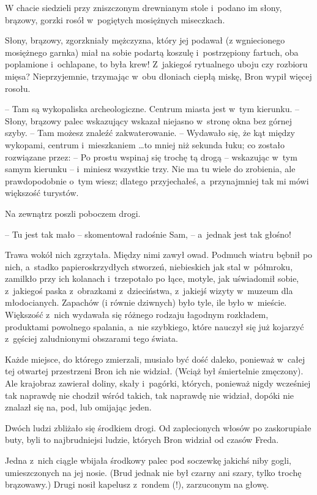 \documentclass[oneside,polish,11pt,rmheadings]{mwbk}
\begin{document}
W chacie siedzieli przy zniszczonym drewnianym stole i~podano im słony, brązowy, gorzki rosół w~pogiętych mosiężnych miseczkach. 

Słony, brązowy, zgorzkniały mężczyzna, który jej podawał (z wgniecionego mosiężnego garnka) miał na sobie podartą koszulę i~postrzępiony fartuch, oba poplamione i~ochlapane, to była krew! Z~jakiegoś rytualnego uboju czy rozbioru mięsa? Nieprzyjemnie, trzymając w~obu dłoniach ciepłą miskę, Bron wypił więcej rosołu. 

-- Tam są wykopaliska archeologiczne. Centrum miasta jest w~tym kierunku. -- Słony, brązowy palec wskazujący wskazał niejasno w~stronę okna bez górnej szyby. -- Tam możesz znaleźć zakwaterowanie. -- Wydawało się, że kąt między wykopami, centrum i~mieszkaniem \ldots  to mniej niż sekunda łuku; co zostało rozwiązane przez: -- Po prostu wspinaj się trochę tą drogą -- wskazując w~tym samym kierunku --  i~miniesz wszystkie trzy. Nie ma tu wiele do zrobienia, ale prawdopodobnie o~tym wiesz; dlatego przyjechałeś, a~przynajmniej tak mi mówi większość turystów. 

Na zewnątrz poszli poboczem drogi. 

-- Tu jest tak mało -- skomentował radośnie Sam, -- a~jednak jest tak głośno! 

Trawa wokół nich zgrzytała. Między nimi zawył owad. Podmuch wiatru bębnił po nich, a~stadko papieroskrzydłych stworzeń, niebieskich jak stal w~półmroku, zamilkło przy ich kolanach i~trzepotało po łące, motyle, jak uświadomił sobie, z~jakiegoś paska z~obrazkami z~dzieciństwa, z~jakiejś wizyty w~muzeum dla młodocianych. Zapachów (i równie dziwnych) było tyle, ile było w~mieście. Większość z~nich wydawała się różnego rodzaju łagodnym rozkładem, produktami powolnego spalania, a~nie szybkiego, które nauczył się już kojarzyć z~gęściej zaludnionymi obszarami tego świata. 

Każde miejsce, do którego zmierzali, musiało być dość daleko, ponieważ w~całej tej otwartej przestrzeni Bron ich nie widział. (Wciąż był śmiertelnie zmęczony). Ale krajobraz zawierał doliny, skały i~pagórki, których, ponieważ nigdy wcześniej tak naprawdę nie chodził wśród takich, tak naprawdę nie widział, dopóki nie znalazł się na, pod, lub omijając jeden. 

Dwóch ludzi zbliżało się środkiem drogi. Od zaplecionych włosów po zaskorupiałe buty, byli to najbrudniejsi ludzie, których Bron widział od czasów Freda. 

Jedna z~nich ciągle wbijała środkowy palec pod soczewkę jakichś niby gogli, umieszczonych na jej nosie. (Brud jednak nie był czarny ani szary, tylko trochę brązowawy.) Drugi nosił kapelusz z~rondem (!), zarzuconym na głowę. 
\end{document}
